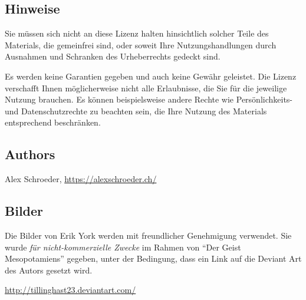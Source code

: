 \documentclass{tufte-handout}
\begin{document}
\begin{fullwidth}
\begin{enumerate}
\end{enumerate}

\subsection{Hinweise}

Sie müssen sich nicht an diese Lizenz halten hinsichtlich solcher
Teile des Materials, die gemeinfrei sind, oder soweit Ihre
Nutzungshandlungen durch Ausnahmen und Schranken des Urheberrechts
gedeckt sind.

Es werden keine Garantien gegeben und auch keine Gewähr geleistet. Die
Lizenz verschafft Ihnen möglicherweise nicht alle Erlaubnisse, die Sie
für die jeweilige Nutzung brauchen. Es können beispielsweise andere
Rechte wie Persönlichkeits- und Datenschutzrechte zu beachten sein,
die Ihre Nutzung des Materials entsprechend beschränken.

\subsection{Authors}

Alex Schroeder, \href{https://alexschroeder.ch/}{https://alexschroeder.ch/}

\subsection{Bilder}

Die Bilder von Erik York werden mit freundlicher Genehmigung
verwendet. Sie wurde \emph{für nicht-kommerzielle Zwecke} im Rahmen
von ``Der Geist Mesopotamiens'' gegeben, unter der Bedingung, dass ein
Link auf die Deviant Art des Autors gesetzt wird.

\href{http://tillinghast23.deviantart.com/}{http://tillinghast23.deviantart.com/}

\end{fullwidth}

\nobibliography{}
\end{document}
